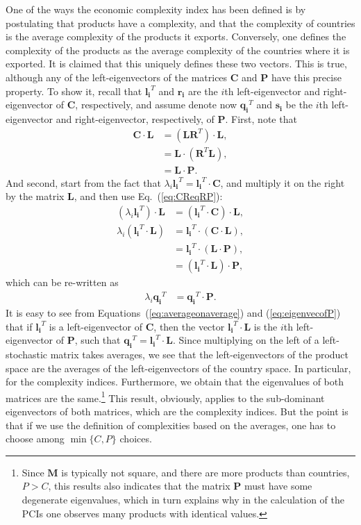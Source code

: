 \documentclass{pnastwo}
\newcommand{\mtx}[1]{\mathbf{ #1}}
\renewcommand{\vec}[1]{\mathbf{#1}}
\begin{document}
\begin{article}
One of the ways the economic complexity index has been defined is by postulating that products have a complexity, and that the complexity of countries is the average complexity of the products it exports. Conversely, one defines the complexity of the products as the average complexity of the countries where it is exported. It is claimed that this uniquely defines these two vectors. This is true, although any of the left-eigenvectors of the matrices $\mtx{C}$ and $\mtx{P}$ have this precise property. To show it, recall that $\vec{l_i}^T$ and $\vec{r_i}$ are the $i$th left-eigenvector and right-eigenvector of $\mtx{C}$, respectively, and assume denote now $\vec{q_i}^T$ and $\vec{s_i}$ be the $i$th left-eigenvector and right-eigenvector, respectively, of $\mtx{P}$. First, note that
\begin{align}
    \mtx{C}\cdot\mtx{L} &= \left(\mtx{L}\mtx{R}^T\right)\cdot\mtx{L}, \nonumber \\
    &= \mtx{L}\cdot\left(\mtx{R}^T\mtx{L}\right), \nonumber \\
    &= \mtx{L}\cdot \mtx{P}.
\label{eq:CReqRP}
\end{align}
And second, start from the fact that $\lambda_i \vec{l_i}^T = \vec{l_i}^T\cdot \mtx{C}$, and multiply it on the right by the matrix $\mtx{L}$, and then use Eq.~(\ref{eq:CReqRP}):
\begin{align}
    \left(\lambda_i \vec{l_i}^T\right)\cdot\mtx{L}&=\left(\vec{l_i}^T\cdot \mtx{C}\right)\cdot\mtx{L}, \nonumber \\
    \lambda_i \left(\vec{l_i}^T\cdot\mtx{L}\right)&= \vec{l_i}^T\cdot \left(\mtx{C}\cdot\mtx{L}\right), \nonumber \\
    &= \vec{l_i}^T\cdot \left(\mtx{L}\cdot \mtx{P}\right), \nonumber \\
    &= \left(\vec{l_i}^T\cdot \mtx{L}\right)\cdot \mtx{P}, \label{eq:averageonaverage}
\end{align}
which can be re-written as
\begin{align}
    \lambda_i \vec{q_i}^T &= \vec{q_i}^T\cdot \mtx{P}. \label{eq:eigenvecofP}
\end{align}
It is easy to see from Equations~(\ref{eq:averageonaverage}) and (\ref{eq:eigenvecofP}) that if $\vec{l_i}^T$ is a left-eigenvector of $\mtx{C}$, then the vector $\vec{l_i}^T\cdot \mtx{L}$ is the $i$th left-eigenvector of $\mtx{P}$, such that $\vec{q_i}^T = \vec{l_i}^T\cdot \mtx{L}$. Since multiplying on the left of a left-stochastic matrix takes averages, we see that the left-eigenvectors of the product space are the averages of the left-eigenvectors of the country space. In particular, for the complexity indices. Furthermore, we obtain that the eigenvalues of both matrices are the same.\footnote{Since $\mtx{M}$ is typically not square, and there are more products than countries, $P>C$, this results also indicates that the matrix $\mtx{P}$ must have some degenerate eigenvalues, which in turn explains why in the calculation of the PCIs one observes many products with identical values.} This result, obviously, applies to the sub-dominant eigenvectors of both matrices, which are the complexity indices. But the point is that if we use the definition of complexities based on the averages, one has to choose among $\min\{C,P\}$ choices.


\end{article}
\end{document}
